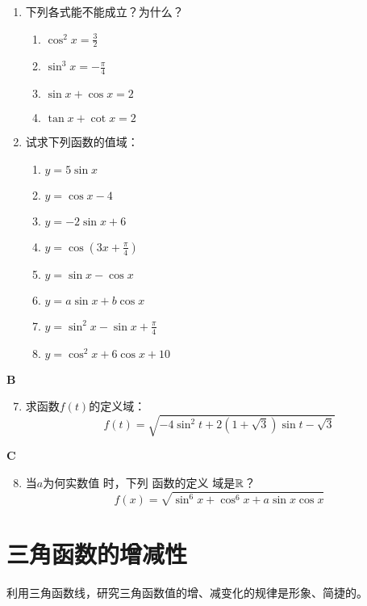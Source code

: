 \begin{enumerate}
\item 下列各式能不能成立？为什么？
\begin{multicols}{2}
\begin{enumerate}[(1)]
    \item $\cos^2 x=\frac{3}{2}$
    \item $\sin^3 x=-\frac{\pi}{4}$
    \item $\sin x+\cos x=2$
    \item $\tan x+\cot x=2$
\end{enumerate}
\end{multicols}

\item 试求下列函数的值域：
\begin{multicols}{2}
\begin{enumerate}[(1)]
    \item $y=5\sin x$
    \item $y=\cos x -4$
    \item $y=-2\sin x+6$
    \item $y=\cos\left(3x+\frac{\pi}{4}\right)$
    \item $y=\sin x-\cos x$
    \item $y=a\sin x+b\cos x$
    \item $y=\sin^2x-\sin x+\frac{\pi}{4}$
    \item $y=\cos^2 x+6\cos x+10$
\end{enumerate}
\end{multicols}
\end{enumerate}

\begin{center}
    \bfseries B
\end{center}
\begin{enumerate}\setcounter{enumi}{6}
    \item 求函数$f(t)$的定义域：
\[f(t)=\sqrt{-4\sin^2 t+2(1+\sqrt{3})\sin t-\sqrt{3}}\]
\end{enumerate}

\begin{center}
    \bfseries C
\end{center}
\begin{enumerate}\setcounter{enumi}{7}
    \item 当$a$为何实数值 时，下列 函数的定义 域是$\mathbb{R}$？
\[f(x)=\sqrt{\sin^6 x+\cos^6 x+a\sin x\cos x}\]
\end{enumerate}

\section{三角函数的增减性}
利用三角函数线，研究三角函数值的增、减变化的规律是形象、简捷的。

